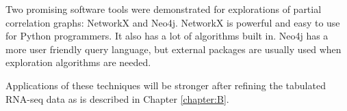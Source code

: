Two promising software tools were demonstrated for explorations of partial correlation graphs: NetworkX and Neo4j.
NetworkX is powerful and easy to use for Python programmers.  It also has a lot of algorithms built in.
Neo4j has a more user friendly query language, but external packages are usually used when exploration algorithms are needed.

Applications of these techniques will be stronger after refining the tabulated RNA-seq data as is described in Chapter \ref{chapter:B}.


